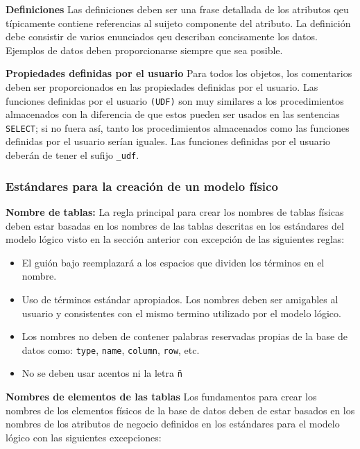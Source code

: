\textbf{Definiciones}
Las definiciones deben ser una frase detallada de los atributos qeu típicamente contiene referencias al suijeto componente del atributo. La definición debe consistir de varios enunciados qeu describan concisamente los datos. Ejemplos de datos deben proporcionarse siempre que sea posible. 

\textbf{Propiedades definidas por el usuario}
Para todos los objetos, los comentarios deben ser proporcionados en las propiedades definidas por el usuario. Las funciones definidas por el usuario \texttt{(UDF)} son muy similares a los procedimientos almacenados con la diferencia de que estos pueden ser usados en las sentencias \texttt{SELECT}; si no fuera así, tanto los procedimientos almacenados como las funciones definidas por el usuario serían iguales. Las funciones definidas por el usuario deberán de tener el sufijo \texttt{_udf}.

\subsubsection{Estándares para la creación de un modelo físico}
\textbf{Nombre de tablas:}
La regla principal para crear los nombres de tablas físicas deben estar basadas en los nombres de las tablas descritas en los estándares del modelo lógico visto en la sección anterior con excepción de las siguientes reglas:
\begin{itemize}
\item El guión bajo reemplazará a los espacios que dividen los términos en el nombre.
\item Uso de términos estándar apropiados. Los nombres deben ser amigables al usuario y consistentes con el mismo termino utilizado por el modelo lógico.
\item Los nombres no deben de contener palabras reservadas propias de la base de datos como: \texttt{type}, \texttt{name}, \texttt{column}, \texttt{row}, etc.
\item No se deben usar acentos ni la letra \texttt{ñ}
\end{itemize}

\textbf{Nombres de elementos de las tablas}
Los fundamentos para crear los nombres de los elementos físicos de la base de datos deben de estar basados en los nombres de los atributos de negocio definidos en los estándares para el modelo lógico con las siguientes excepciones:


